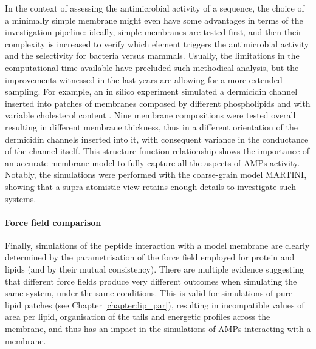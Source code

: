 In the context of assessing the antimicrobial activity of a sequence, the choice of a minimally simple membrane might even have some advantages in terms of the investigation pipeline: ideally, simple membranes are tested first, and then their complexity is increased to verify which element triggers the antimicrobial activity and the selectivity for bacteria versus mammals. Usually, the limitations in the computational time available have precluded such methodical analysis, but the improvements witnessed in the last years are allowing for a more extended sampling.
%
For example, an in silico experiment simulated a dermicidin channel inserted into patches of membranes composed by different phospholipids and with variable cholesterol content \cite{Song2019}. Nine membrane compositions were tested overall resulting in different membrane thickness, thus in a different orientation of the dermicidin channels inserted into it, with consequent variance in the conductance of the channel itself. This structure-function relationship shows the importance of an accurate membrane model to fully capture all the aspects of AMPs activity. Notably, the simulations were performed with the coarse-grain model MARTINI, showing that a supra atomistic view retains enough details to investigate such systems.


\paragraph{Force field comparison} Finally, simulations of the peptide interaction with a model membrane are clearly determined by the parametrisation of the force field employed for protein and lipids (and by their mutual consistency).
%
There are multiple evidence suggesting that different force fields produce very different outcomes when simulating the same system, under the same conditions. This is valid for simulations of pure lipid patches (see Chapter \ref{chapter:lip_par}), resulting in incompatible values of area per lipid, organisation of the tails and energetic profiles across the membrane, and thus has an impact in the simulations of AMPs interacting with a membrane.

